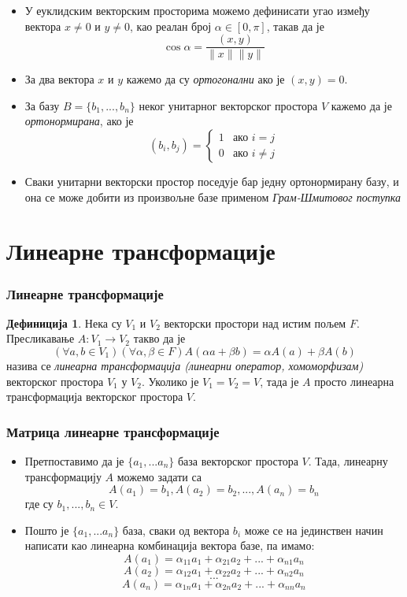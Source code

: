 \documentclass{beamer}
\theoremstyle{plain}
\theoremstyle{definition}
\newtheorem*{defn}{Дефиниција}
\begin{document}
\begin{frame}
\begin{itemize}
\item У еуклидским векторским просторима можемо дефинисати угао између вектора $x\neq 0$ и $y\neq 0$, као реалан број $\alpha\in [0, \pi]$, такав да је $$\cos \alpha = \frac{(x, y)}{\|x\|\|y\|}$$
\item За два вектора $x$ и $y$ кажемо да су \emph{ортогонални} ако је $(x, y) = 0$.

\item За базу $B=\{b_1, ..., b_n\}$ неког унитарног векторског простора $V$ кажемо да је \emph{ортонормирана}, ако је
$$(b_i, b_j) = \begin{cases}
                1 & \mbox{ако } i=j \\
                0 & \mbox{ако } i\neq j
               \end{cases}$$
\item Сваки унитарни векторски простор поседује бар једну ортонормирану базу, и она се може добити из произвољне базе применом \emph{Грам-Шмитовог поступка}
\end{itemize}
\end{frame}

\section{Линеарне трансформације}

\begin{frame}
\frametitle{Линеарне трансформације}
\begin{defn}
Нека су $V_1$ и $V_2$ векторски простори над истим пољем $F$. Пресликавање $A: V_1\to V_2$ такво да је
$$(\forall a, b\in V_1)(\forall \alpha, \beta \in F) A(\alpha a+ \beta b) = \alpha A(a) + \beta A(b)$$
назива се \emph{линеарна трансформација (линеарни оператор, хомоморфизам)} векторског простора $V_1$ у $V_2$. Уколико је $V_1 = V_2 = V$, тада је $A$ просто линеарна трансформација векторског простора $V$.
\end{defn}
\end{frame}

\begin{frame}
\frametitle{Матрица линеарне трансформације}
\begin{itemize}
\item Претпоставимо да је $\{a_1, ...a_n\}$ база векторског простора $V$. Тада, линеарну трансформацију $A$ можемо задати са
$$A(a_1) = b_1, A(a_2) = b_2, ..., A(a_n) = b_n$$
где су $b_1, ..., b_n\in V$.
\item Пошто је $\{a_1, ...a_n\}$ база, сваки од вектора $b_i$ може се на јединствен начин написати као линеарна комбинација вектора базе, па имамо:
$$A(a_1) = \alpha_{11}a_1 + \alpha_{21}a_2 + ... + \alpha_{n1}a_n$$
$$A(a_2) = \alpha_{12}a_1 + \alpha_{22}a_2 + ... + \alpha_{n2}a_n$$
$$...$$
$$A(a_n) = \alpha_{1n}a_1 + \alpha_{2n}a_2 + ... + \alpha_{nn}a_n$$
\end{itemize}
\end{frame}
\end{document}
